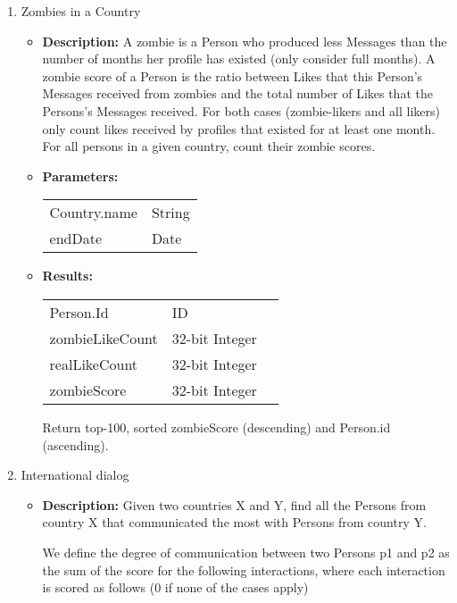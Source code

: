 {\begin{enumerate}
            \item Zombies in a Country
            \begin{itemize}
                \item \textbf{Description:}
                    A zombie is a Person who produced less Messages than the number of months her profile has existed
                    (only consider full months).  A zombie score of a Person is the ratio between Likes that this
                    Person's Messages received from zombies and the total number of Likes that the Persons's Messages
                    received.  For both cases (zombie-likers and all likers) only count likes received by profiles that
                    existed for at least one month.  For all persons in a given country, count their zombie scores.
                \item \textbf{Parameters:} \\
                    \begin{tabular}{ll}
                      Country.name & String  \\
                      endDate & Date \\
                    \end{tabular}
                \item \textbf{Results:} \\
                    \begin{tabular}{lll}
                      Person.Id & ID & \\
                      zombieLikeCount & 32-bit Integer & \\
                      realLikeCount & 32-bit Integer & \\
                      zombieScore & 32-bit Integer & \\
                    \end{tabular}
                    Return top-100, sorted zombieScore (descending) and Person.id (ascending).
                    \end{itemize}

            \item International dialog
            \begin{itemize}
                \item \textbf{Description:}
                  Given two countries X and Y, find all the Persons from country X that communicated the most with
                  Persons from country Y.

                  We define the degree of communication between two Persons p1 and p2 as the sum of the score for the
                  following interactions, where each interaction is scored as follows  (0 if none of the cases apply)


\end{itemize}
\end{enumerate}}
